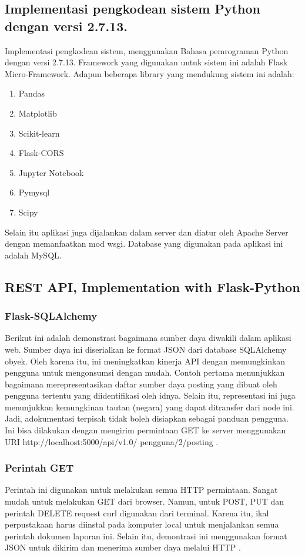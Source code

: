\subsection{Implementasi pengkodean sistem Python dengan versi 2.7.13.}
Implementasi pengkodean sistem, menggunakan Bahasa pemrograman Python dengan versi 2.7.13. Framework yang digunakan untuk sistem ini adalah Flask Micro-Framework. Adapun beberapa library yang mendukung sistem ini adalah:
\begin{enumerate}
\item Pandas
\item Matplotlib
\item Scikit-learn
\item Flask-CORS
\item Jupyter Notebook
\item Pymysql
\item Scipy
\end{enumerate}
Selain itu aplikasi juga dijalankan dalam server dan diatur oleh Apache Server dengan memanfaatkan mod wsgi. Database yang digunakan pada aplikasi ini adalah MySQL\cite{gunawan2018aplikasi}.
\subsection{REST API, Implementation with Flask-Python}
\subsubsection{Flask-SQLAlchemy}
Berikut ini adalah demonstrasi bagaimana sumber daya diwakili dalam aplikasi web.
Sumber daya ini diserialkan ke format JSON dari database SQLAlchemy obyek. Oleh karena itu, ini meningkatkan kinerja API dengan memungkinkan pengguna untuk mengonsumsi dengan mudah. Contoh pertama menunjukkan bagaimana merepresentasikan daftar sumber daya posting yang dibuat oleh pengguna tertentu yang diidentifikasi oleh idnya. Selain itu, representasi ini juga menunjukkan kemungkinan tautan (negara) yang dapat ditransfer dari node ini. Jadi, adokumentasi terpisah tidak boleh disiapkan sebagai panduan pengguna. Ini bisa dilakukan dengan mengirim permintaan GET ke server menggunakan URI http://localhost:5000/api/v1.0/ pengguna/2/posting \cite{alemu2014rest}.
\subsubsection{Perintah GET}
Perintah ini digunakan untuk melakukan semua HTTP permintaan. Sangat mudah untuk melakukan GET dari browser. Namun, untuk POST, PUT dan perintah DELETE request curl digunakan dari terminal. Karena itu, ikal perpustakaan harus diinstal pada komputer local untuk menjalankan semua perintah dokumen laporan ini. Selain itu, demontrasi ini menggunakan format JSON untuk dikirim dan menerima sumber daya melalui HTTP \cite{alemu2014rest}.

